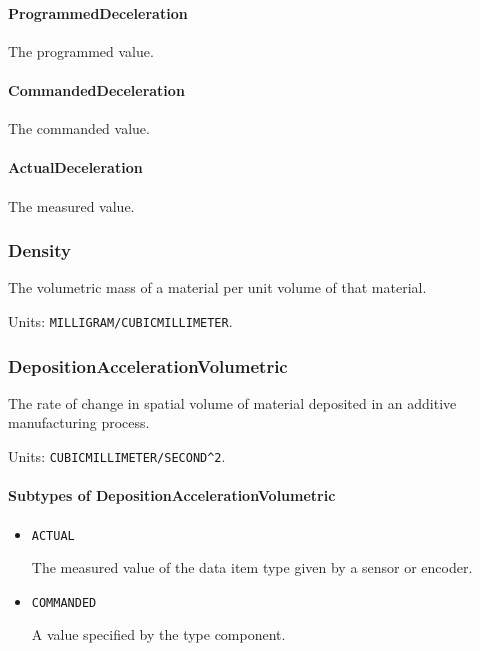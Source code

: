 \paragraph{ProgrammedDeceleration}\mbox{}
\label{sec:ProgrammedDeceleration}


The programmed value.


\paragraph{CommandedDeceleration}\mbox{}
\label{sec:CommandedDeceleration}


The commanded value.


\paragraph{ActualDeceleration}\mbox{}
\label{sec:ActualDeceleration}


The measured value.


\subsubsection{Density}
\label{sec:Density}



The volumetric mass of a material per unit volume of that material.


Units: \texttt{MILLIGRAM/CUBIC\textunderscore MILLIMETER}.

\subsubsection{DepositionAccelerationVolumetric}
\label{sec:DepositionAccelerationVolumetric}



The rate of change in spatial volume of material deposited in an additive manufacturing process.


Units: \texttt{CUBIC\textunderscore MILLIMETER/SECOND\^{}2}.

\paragraph{Subtypes of DepositionAccelerationVolumetric}\mbox{}
\label{sec:Subtypes of DepositionAccelerationVolumetric}

\begin{itemize}

\item \texttt{ACTUAL}


The measured value of the data item type given by a sensor or encoder.

\item \texttt{COMMANDED}


A value specified by the  type component.


\end{itemize}

